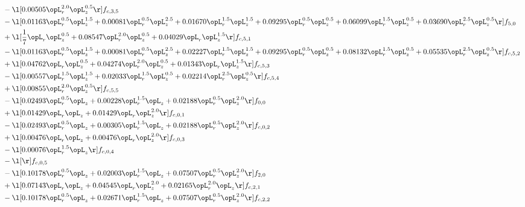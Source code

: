 \begin{alignat}{2}
& - \l[  0.00505 \opL_r^{2.0} \opL_z^{0.5}  \r] f_{c,3,5} \nonumber \\ 
& - \l[  0.01163 \opL_r^{0.5} \opL_z^{1.5} +  0.00081 \opL_r^{0.5} \opL_z^{2.5} +  0.01670 \opL_r^{1.5} \opL_z^{1.5} +  0.09295 \opL_r^{0.5} \opL_z^{0.5} +  0.06099 \opL_r^{1.5} \opL_z^{0.5} +  0.03690 \opL_r^{2.5} \opL_z^{0.5}  \r] f_{5,0} \nonumber \\ 
& + \l[ \frac{1}{7} \opL_r \opL_z^{0.5} +  0.08547 \opL_r^{2.0} \opL_z^{0.5} +  0.04029 \opL_r \opL_z^{1.5}  \r] f_{c,5,1} \nonumber \\ 
& - \l[  0.01163 \opL_r^{0.5} \opL_z^{1.5} +  0.00081 \opL_r^{0.5} \opL_z^{2.5} +  0.02227 \opL_r^{1.5} \opL_z^{1.5} +  0.09295 \opL_r^{0.5} \opL_z^{0.5} +  0.08132 \opL_r^{1.5} \opL_z^{0.5} +  0.05535 \opL_r^{2.5} \opL_z^{0.5}  \r] f_{c,5,2} \nonumber \\ 
& + \l[  0.04762 \opL_r \opL_z^{0.5} +  0.04274 \opL_r^{2.0} \opL_z^{0.5} +  0.01343 \opL_r \opL_z^{1.5}  \r] f_{c,5,3} \nonumber \\ 
& - \l[  0.00557 \opL_r^{1.5} \opL_z^{1.5} +  0.02033 \opL_r^{1.5} \opL_z^{0.5} +  0.02214 \opL_r^{2.5} \opL_z^{0.5}  \r] f_{c,5,4} \nonumber \\ 
& + \l[  0.00855 \opL_r^{2.0} \opL_z^{0.5}  \r] f_{c,5,5} \nonumber \\ 
& - \l[  0.02493 \opL_r^{0.5} \opL_z +  0.00228 \opL_r^{1.5} \opL_z +  0.02188 \opL_r^{0.5} \opL_z^{2.0}  \r] f_{0,0} \nonumber \\ 
& + \l[  0.01429 \opL_r \opL_z +  0.01429 \opL_r \opL_z^{2.0}  \r] f_{c,0,1} \nonumber \\ 
& - \l[  0.02493 \opL_r^{0.5} \opL_z +  0.00305 \opL_r^{1.5} \opL_z +  0.02188 \opL_r^{0.5} \opL_z^{2.0}  \r] f_{c,0,2} \nonumber \\ 
& + \l[  0.00476 \opL_r \opL_z +  0.00476 \opL_r \opL_z^{2.0}  \r] f_{c,0,3} \nonumber \\ 
& - \l[  0.00076 \opL_r^{1.5} \opL_z  \r] f_{c,0,4} \nonumber \\ 
& - \l[  \r] f_{c,0,5} \nonumber \\ 
& - \l[  0.10178 \opL_r^{0.5} \opL_z +  0.02003 \opL_r^{1.5} \opL_z +  0.07507 \opL_r^{0.5} \opL_z^{2.0}  \r] f_{2,0} \nonumber \\ 
& + \l[  0.07143 \opL_r \opL_z +  0.04545 \opL_r \opL_z^{2.0} +  0.02165 \opL_r^{2.0} \opL_z  \r] f_{c,2,1} \nonumber \\ 
& - \l[  0.10178 \opL_r^{0.5} \opL_z +  0.02671 \opL_r^{1.5} \opL_z +  0.07507 \opL_r^{0.5} \opL_z^{2.0}  \r] f_{c,2,2} \nonumber \\ 

\end{alignat}
